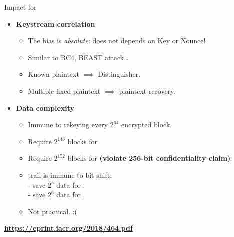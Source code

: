 \documentclass[aspectratio=169,10pt,webfont]{beamer}
\begin{document}
\begin{frame}{Impact for \MORUS}

\begin{itemize}
  \item \textbf{Keystream correlation}
    \begin{itemize}
      \item The bias is \textit{absolute}: does not depends on Key or Nounce!
      \item Similar to RC4, BEAST attack\ldots
      \item Known plaintext $\implies$ Distinguisher.
      \item Multiple fixed plaintext $\implies$ plaintext recovery.
    \end{itemize}
  \pause
  \item \textbf{Data complexity}
    \begin{itemize}
      \item Immune to rekeying every $2^{64}$ encrypted block.
      \item Require $2^{146}$ blocks for \MORUS[640]
      \item Require $2^{152}$ blocks for \MORUS[1280] \textbf{\alert{(violate 256-bit confidentiality claim)}}
      \item trail is immune to bit-shift:\\
        - save $2^5$ data for \MORUS[640].\\
        - save $2^6$ data for \MORUS[1280].\\
      \item Not practical. :(
    \end{itemize}
\end{itemize}

\end{frame}


\begin{frame}[standout]

\centerline{\huge\textbf{\url{https://eprint.iacr.org/2018/464.pdf}}}

\end{frame}
\end{document}
